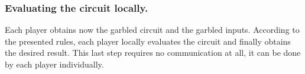 \subsubsection{Evaluating the circuit locally.}
\label{sec:review-eveluating-circuit}

Each player obtains now the garbled circuit and the garbled inputs. According to the presented rules, each player locally evaluates the circuit and finally obtains the desired result. This last step requires no communication at all, it can be done by each player individually.

